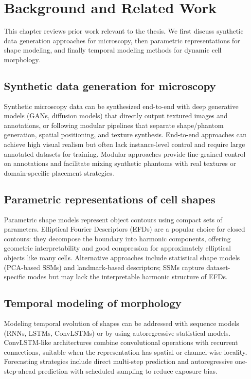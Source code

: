 \chapter{Background and Related Work}
\label{ch:background_related}

This chapter reviews prior work relevant to the thesis. We first discuss synthetic data generation approaches for microscopy, then parametric representations for shape modeling, and finally temporal modeling methods for dynamic cell morphology.

\section{Synthetic data generation for microscopy}
Synthetic microscopy data can be synthesized end-to-end with deep generative models (GANs, diffusion models) that directly output textured images and annotations, or following modular pipelines that separate shape/phantom generation, spatial positioning, and texture synthesis. End-to-end approaches can achieve high visual realism but often lack instance-level control and require large annotated datasets for training. Modular approaches provide fine-grained control on annotations and facilitate mixing synthetic phantoms with real textures or domain-specific placement strategies.

\section{Parametric representations of cell shapes}
Parametric shape models represent object contours using compact sets of parameters. Elliptical Fourier Descriptors (EFDs) are a popular choice for closed contours: they decompose the boundary into harmonic components, offering geometric interpretability and good compression for approximately elliptical objects like many cells. Alternative approaches include statistical shape models (PCA-based SSMs) and landmark-based descriptors; SSMs capture dataset-specific modes but may lack the interpretable harmonic structure of EFDs.

\section{Temporal modeling of morphology}
Modeling temporal evolution of shapes can be addressed with sequence models (RNNs, LSTMs, ConvLSTMs) or by using autoregressive statistical models. ConvLSTM-like architectures combine convolutional operations with recurrent connections, suitable when the representation has spatial or channel-wise locality. Forecasting strategies include direct multi-step prediction and autoregressive one-step-ahead prediction with scheduled sampling to reduce exposure bias.

